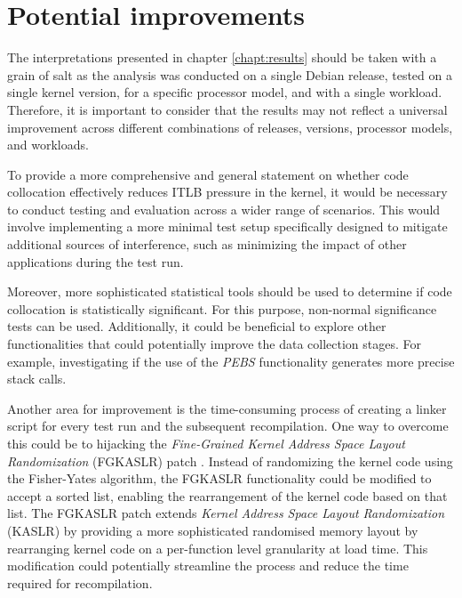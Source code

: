 \chapter{Potential improvements}\label{chapt:improv}

The interpretations presented in chapter \ref{chapt:results} should be taken with a grain of salt as the analysis was conducted on a single Debian release, tested on a single kernel version, for a specific processor model, and with a single workload. Therefore, it is important to consider that the results may not reflect a universal improvement across different combinations of releases, versions, processor models, and workloads.

To provide a more comprehensive and general statement on whether code collocation effectively reduces ITLB pressure in the kernel, it would be necessary to conduct testing and evaluation across a wider range of scenarios. This would involve implementing a more minimal test setup specifically designed to mitigate additional sources of interference, such as minimizing the impact of other applications during the test run.

Moreover, more sophisticated statistical tools should be used to determine if code collocation is statistically significant. For this purpose, non-normal significance tests can be used. \cite[p. 22-25]{patmc} Additionally, it could be beneficial to explore other functionalities that could potentially improve the data collection stages. For example, investigating if the use of the \textit{PEBS} functionality generates more precise stack calls.

\enlargethispage{\baselineskip}
Another area for improvement is the time-consuming process of creating a linker script for every test run and the subsequent recompilation. One way to overcome this could be to hijacking the \textit{Fine-Grained Kernel Address Space Layout Randomization} (FGKASLR) patch \cite{fgkaslrpatch}. Instead of randomizing the kernel code using the Fisher-Yates algorithm, the FGKASLR functionality could be modified to accept a sorted list, enabling the rearrangement of the kernel code based on that list. The FGKASLR patch extends \textit{Kernel Address Space Layout Randomization} (KASLR) by providing a more sophisticated randomised memory layout by rearranging kernel code on a per-function level granularity at load time. \cite{lwnrandom} \cite{fgkaslrartical} This modification could potentially streamline the process and reduce the time required for recompilation.